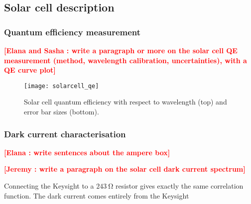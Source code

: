\documentclass[onecolumn]{aa}
\newcommand{\todo}[1]{\textbf{\textcolor{red}{[#1]}}\xspace}
\begin{document}
\subsection{Solar cell description}

\subsubsection{Quantum efficiency measurement}
 
\todo{Elana and Sasha : write a paragraph or more on the solar cell QE measurement (method, wavelength calibration, uncertainties), with a QE curve plot}

\begin{figure}[!h]
\centering
\texttt{[image: solarcell\_qe]}
\caption{Solar cell quantum efficiency with respect to wavelength (top) and error bar sizes (bottom).}
\end{figure}

\subsubsection{Dark current characterisation}

\todo{Elana : write sentences about the ampere box}

\todo{Jeremy : write a paragraph on the solar cell dark current spectrum}


Connecting the Keysight to a $\SI{243}{\ohm}$ resistor gives exactly the same
correlation function. The dark current comes entirely from the Keysight




  
\end{document}
